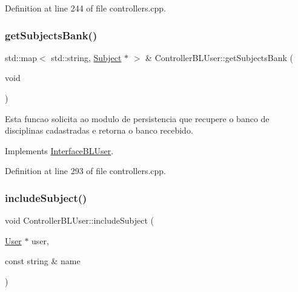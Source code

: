 Definition at line 244 of file controllers.\+cpp.

\mbox{\label{class_controller_b_l_user_a2f422b6fdb912d9bec90af7de56e7656}} 
\subsubsection{\texorpdfstring{get\+Subjects\+Bank()}{getSubjectsBank()}}
{\footnotesize\ttfamily std\+::map$<$ std\+::string, \hyperlink{class_subject}{Subject} $\ast$ $>$ \& Controller\+B\+L\+User\+::get\+Subjects\+Bank (\begin{DoxyParamCaption}\item[{void}]{ }\end{DoxyParamCaption})\hspace{0.3cm}{\ttfamily [virtual]}}

Esta funcao solicita ao modulo de persistencia que recupere o banco de disciplinas cadastradas e retorna o banco recebido. 

Implements \hyperlink{class_interface_b_l_user_a36499250fd10ab2875bbdeb6a0dd4030}{Interface\+B\+L\+User}.



Definition at line 293 of file controllers.\+cpp.

\mbox{\label{class_controller_b_l_user_acece0a3e60fb4fbf748783f1370e9d79}} 
\subsubsection{\texorpdfstring{include\+Subject()}{includeSubject()}}
{\footnotesize\ttfamily void Controller\+B\+L\+User\+::include\+Subject (\begin{DoxyParamCaption}\item[{\hyperlink{class_user}{User} $\ast$}]{user,  }\item[{const string \&}]{name }\end{DoxyParamCaption})\hspace{0.3cm}{\ttfamily [virtual]}}

